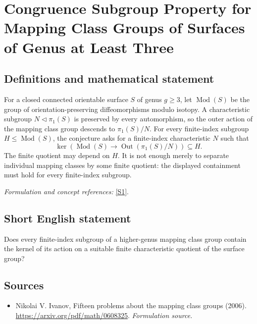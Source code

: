 \documentclass[11pt]{article}
\begin{document}
\section*{\texorpdfstring{Congruence Subgroup Property for Mapping Class Groups of Surfaces of Genus at Least Three}{Congruence Subgroup Property for Mapping Class Groups of Surfaces of Genus at Least Three}}\label{30006986}
\subsection{Definitions and mathematical statement}
For a closed connected orientable surface $S$ of genus $g\ge3$, let $\operatorname{Mod}(S)$ be the group of orientation-preserving diffeomorphisms modulo isotopy. A characteristic subgroup $N\triangleleft\pi_1(S)$ is preserved by every automorphism, so the outer action of the mapping class group descends to $\pi_1(S)/N$. For every finite-index subgroup $H\le\operatorname{Mod}(S)$, the conjecture asks for a finite-index characteristic $N$ such that
\[
 \ker\!\left(\operatorname{Mod}(S)\longrightarrow
 \operatorname{Out}(\pi_1(S)/N)\right)\subseteq H.
\]
The finite quotient may depend on $H$. It is not enough merely to separate individual mapping classes by some finite quotient: the displayed containment must hold for every finite-index subgroup.
\par\smallskip\textit{Formulation and concept references:} \href{https://arxiv.org/pdf/math/0608325}{[S1]}.

\subsection{Short English statement}
Does every finite-index subgroup of a higher-genus mapping class group contain the kernel of its action on a suitable finite characteristic quotient of the surface group?
\subsection{Sources}
\begin{itemize}
\item[S1]Nikolai V. Ivanov, Fifteen problems about the mapping class groups (2006).
\url{https://arxiv.org/pdf/math/0608325}.
\textit{Formulation source.}
\end{itemize}
\end{document}
